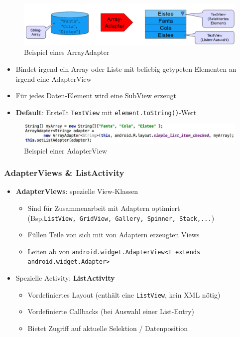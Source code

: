 \documentclass[a4paper]{article}
\begin{document}
\vspace{3em}

\begin{figure}[htb!]
	\centering
	\includegraphics[width=.8\textwidth]{img/adapter_string.png}
	\caption{Beispiel eines ArrayAdapter}
\end{figure}
\begin{itemize}
	\item Bindet irgend ein Array oder Liste mit beliebig getypeten Elementen an irgend eine AdapterView
	\item Für jedes Daten-Element wird eine SubView erzeugt
	\item \textbf{Default}: Erstellt \texttt{TextView} mit \texttt{element.toString()}-Wert
\end{itemize}
\begin{figure}[htb!]
	\centering
	\includegraphics[width=.8\textwidth]{img/adapterview_example.jpg}
	\caption{Beispiel einer AdapterView}
\end{figure}

\subsubsection{AdapterViews \& ListActivity}

\begin{itemize}
	\item \textbf{AdapterViews}: spezielle View-Klassen
		\begin{itemize}
			\item Sind für Zusammenarbeit mit Adaptern optimiert \\
			(Bsp.\texttt{ListView, GridView, Gallery, Spinner, Stack,...})
			\item Füllen Teile von sich mit von Adaptern erzeugten Views
			\item Leiten ab von \texttt{android.widget.AdapterView<T extends android.widget.Adapter>}
		\end{itemize}
	\item Spezielle Activity: \textbf{ListActivity}
		\begin{itemize}
			\item Vordefiniertes Layout (enthält eine \texttt{ListView}, kein XML nötig)
			\item Vordefinierte Callbacks (bei Auswahl einer List-Entry)
			\item Bietet Zugriff auf aktuelle Selektion / Datenposition
		\end{itemize}
\end{itemize}
\end{document}
